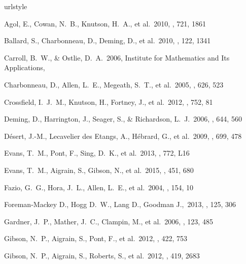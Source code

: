\documentclass[twocolumn]{aastex61}
\begin{document}
\begin{thebibliography}{38}
\providecommand{\natexlab}[1]{#1}
\providecommand{\url}[1]{\texttt{#1}}
\expandafter\ifx\csname urlstyle\endcsname\relax
  \providecommand{\doi}[1]{doi: #1}\else
  \providecommand{\doi}{doi: \begingroup \urlstyle{rm}\Url}\fi

 Agol, E., Cowan, N.~B., Knutson, H.~A., et al.\ 2010, \apj, 721, 1861

 Ballard, S., Charbonneau, D., Deming, D., et al.\ 2010, \pasp, 122, 1341

 Carroll, B.~W., \& Ostlie, D.~A.\ 2006, Institute for Mathematics and Its Applications,

 Charbonneau, D., Allen, L.~E., Megeath, S.~T., et al.\ 2005, \apj, 626, 523

 Crossfield, I.~J.~M., Knutson, H., Fortney, J., et al.\ 2012, \apj, 752, 81

 Deming, D., Harrington, J., Seager, S., \& Richardson, L.~J.\ 2006, \apj, 644, 560

 D{\'e}sert, J.-M., Lecavelier des Etangs, A., H{\'e}brard, G., et al.\ 2009, \apj, 699, 478

 Evans, T.~M., Pont, F., Sing, D.~K., et al.\ 2013, \apjl, 772, L16

 Evans, T.~M., Aigrain, S., Gibson, N., et al.\ 2015, \mnras, 451, 680

 Fazio, G.~G., Hora, J.~L., Allen, L.~E., et al.\ 2004, \apjs, 154, 10

 Foreman-Mackey D., Hogg D.~W., Lang D., Goodman J.,\ 2013, \pasp, 125, 306

 Gardner, J.~P., Mather, J.~C., Clampin, M., et al.\ 2006, \ssr, 123, 485

\bibitem[Gibson et al.(2012{\natexlab{a}})]{gibson2012a} Gibson, N.~P., Aigrain, S., Pont, F., et al.\ 2012, \mnras, 422, 753

\bibitem[Gibson et al.(2012{\natexlab{b}})]{gibson2012b} Gibson, N.~P., Aigrain, S., Roberts, S., et al.\ 2012, \mnras, 419, 2683


\end{thebibliography}
\end{document}
